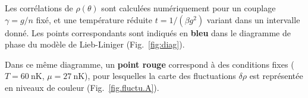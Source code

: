 
Les corrélations de \( \rho(\theta) \) sont calculées numériquement pour un couplage \(\gamma = g/n\) fixé, et une température réduite \( t = 1 / (\beta g^2) \) variant dans un intervalle donné. Les points correspondants sont indiqués en \textbf{bleu} dans le diagramme de phase du modèle de Lieb-Liniger (Fig.~\ref{fig:diag}).

Dans ce même diagramme, un \textbf{point rouge} correspond à des conditions fixes (\(T = 60~\mathrm{nK}\), \( \mu = 27~\mathrm{nK} \)), pour lesquelles la carte des fluctuations \( \delta \rho \) est représentée en niveaux de couleur (Fig.~\ref{fig.fluctu.A}).


